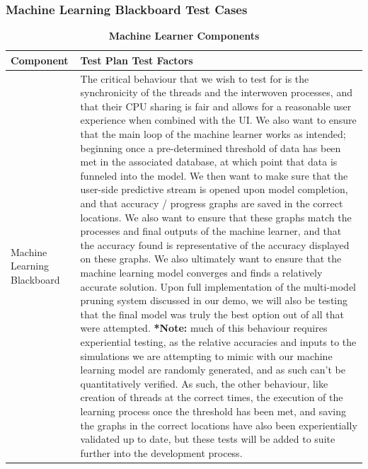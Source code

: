 \documentclass[12pt, titlepage]{article}
\begin{document}
\subsubsection{Machine Learning Blackboard Test Cases}
\begin{center}
\begin{table}[H]
\centering
\begin{tabular}{ |p{5cm}|p{10cm}|  } 
 \hline
\bf Component & \bf Test Plan Test Factors\\
\hline
 Machine Learning Blackboard & The critical behaviour that we wish to test for is the synchronicity of the threads and the interwoven processes, and that their CPU sharing is fair and allows for a reasonable user experience when combined with the UI. We also want to ensure that the main loop of the machine learner works as intended; beginning once a pre-determined threshold of data has been met in the associated database, at which point that data is funneled into the model. We then want to make sure that the user-side predictive stream is opened upon model completion, and that accuracy / progress graphs are saved in the correct locations. We also want to ensure that these graphs match the processes and final outputs of the machine learner, and that the accuracy found is representative of the accuracy displayed on these graphs. We also ultimately want to ensure that the machine learning model converges and finds a relatively accurate solution. Upon full implementation of the multi-model pruning system discussed in our demo, we will also be testing that the final model was truly the best option out of all that were attempted. \textbf{*Note:} much of this behaviour requires experiential testing, as the relative accuracies and inputs to the simulations we are attempting to mimic with our machine learning model are randomly generated, and as such can't be quantitatively verified. As such, the other behaviour, like creation of threads at the correct times, the execution of the learning process once the threshold has been met, and saving the graphs in the correct locations have also been experientially validated up to date, but these tests will be added to suite further into the development process.\\
 \hline
\end{tabular}
\caption{\bf Machine Learner Components}
\label{tab:my_label15}
\end{table}
\end{center}
\end{document}
